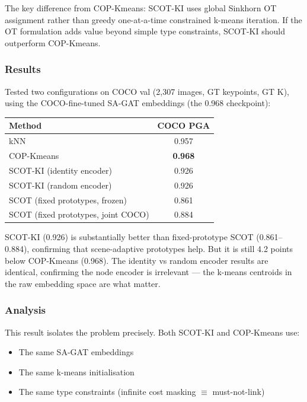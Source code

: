 The key difference from COP-Kmeans: SCOT-KI uses global Sinkhorn OT assignment rather than greedy one-at-a-time constrained k-means iteration. If the OT formulation adds value beyond simple type constraints, SCOT-KI should outperform COP-Kmeans.

\subsubsection{Results}

Tested two configurations on COCO val (2,307 images, GT keypoints, GT K), using the COCO-fine-tuned SA-GAT embeddings (the 0.968 checkpoint):

\begin{tabular}{lc}
\hline
\textbf{Method} & \textbf{COCO PGA} \\
\hline
kNN & 0.957 \\
COP-Kmeans & \textbf{0.968} \\
SCOT-KI (identity encoder) & 0.926 \\
SCOT-KI (random encoder) & 0.926 \\
\hline
SCOT (fixed prototypes, frozen) & 0.861 \\
SCOT (fixed prototypes, joint COCO) & 0.884 \\
\hline
\end{tabular}

\vspace{0.5em}

SCOT-KI (0.926) is substantially better than fixed-prototype SCOT (0.861--0.884), confirming that scene-adaptive prototypes help. But it is still 4.2 points below COP-Kmeans (0.968). The identity vs random encoder results are identical, confirming the node encoder is irrelevant --- the k-means centroids in the raw embedding space are what matter.

\subsubsection{Analysis}

This result isolates the problem precisely. Both SCOT-KI and COP-Kmeans use:
\begin{itemize}
    \item The same SA-GAT embeddings
    \item The same k-means initialisation
    \item The same type constraints (infinite cost masking $\equiv$ must-not-link)
\end{itemize}

